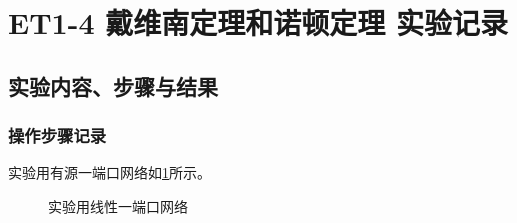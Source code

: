 \documentclass[dvipsnames, svgnames,a4paper,11pt]{article}
\begin{document}
	\section{ET1-4 戴维南定理和诺顿定理  \quad\heiti 实验记录}
	
	\subsection{实验内容、步骤与结果}
	
	\subsubsection{操作步骤记录}
	
	实验用有源一端口网络如\cref{fig:graph2}所示。
	

		\begin{figure}[htbp]
			\centering
			\quad
			\quad
			\caption{实验用线性一端口网络}
			\label{fig:graph2}
		\end{figure}


	
\end{document}
